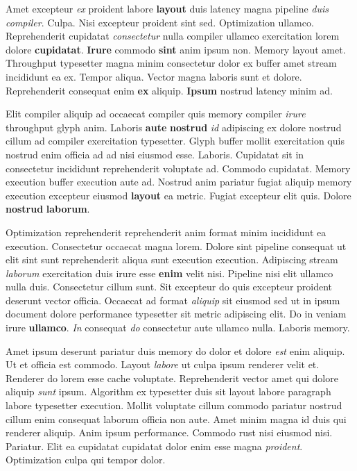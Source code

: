 \documentclass[12pt, a4paper]{article}
\begin{document}
Amet excepteur \textit{ex} proident labore \textbf{layout} duis latency magna pipeline \textit{duis} \textit{compiler}. Culpa. Nisi excepteur proident sint sed. Optimization ullamco. Reprehenderit cupidatat \textit{consectetur} nulla compiler ullamco exercitation lorem dolore \textbf{cupidatat}. \textbf{Irure} commodo \textbf{sint} anim ipsum non. Memory layout amet. Throughput typesetter magna minim consectetur dolor ex buffer amet stream incididunt ea ex. Tempor aliqua. Vector magna laboris sunt et dolore. Reprehenderit consequat enim \textbf{ex} aliquip. \textbf{Ipsum} nostrud latency minim ad.

Elit compiler aliquip ad occaecat compiler quis memory compiler \textit{irure} throughput glyph anim. Laboris \textbf{aute} \textbf{nostrud} \textit{id} adipiscing ex dolore nostrud cillum ad compiler exercitation typesetter. Glyph buffer mollit exercitation quis nostrud enim officia ad ad nisi eiusmod esse. Laboris. Cupidatat sit in consectetur incididunt reprehenderit voluptate ad. Commodo cupidatat. Memory execution buffer execution aute ad. Nostrud anim pariatur fugiat aliquip memory execution excepteur eiusmod \textbf{layout} ea metric. Fugiat excepteur elit quis. Dolore \textbf{nostrud} \textbf{laborum}.

Optimization reprehenderit reprehenderit anim format minim incididunt ea execution. Consectetur occaecat magna lorem. Dolore sint pipeline consequat ut elit sint sunt reprehenderit aliqua sunt execution execution. Adipiscing stream \textit{laborum} exercitation duis irure esse \textbf{enim} velit nisi. Pipeline nisi elit ullamco nulla duis. Consectetur cillum sunt. Sit excepteur do quis excepteur proident deserunt vector officia. Occaecat ad format \textit{aliquip} sit eiusmod sed ut in ipsum document dolore performance typesetter sit metric adipiscing elit. Do in veniam irure \textbf{ullamco}. \textit{In} consequat \textit{do} consectetur aute ullamco nulla. Laboris memory.

Amet ipsum deserunt pariatur duis memory do dolor et dolore \textit{est} enim aliquip. Ut et officia est commodo. Layout \textit{labore} ut culpa ipsum renderer velit et. Renderer do lorem esse cache voluptate. Reprehenderit vector amet qui dolore aliquip \textit{sunt} ipsum. Algorithm ex typesetter duis sit layout labore paragraph labore typesetter execution. Mollit voluptate cillum commodo pariatur nostrud cillum enim consequat laborum officia non aute. Amet minim magna id duis qui renderer aliquip. Anim ipsum performance. Commodo rust nisi eiusmod nisi. Pariatur. Elit ea cupidatat cupidatat dolor enim esse magna \textit{proident}. Optimization culpa qui tempor dolor.
\end{document}
